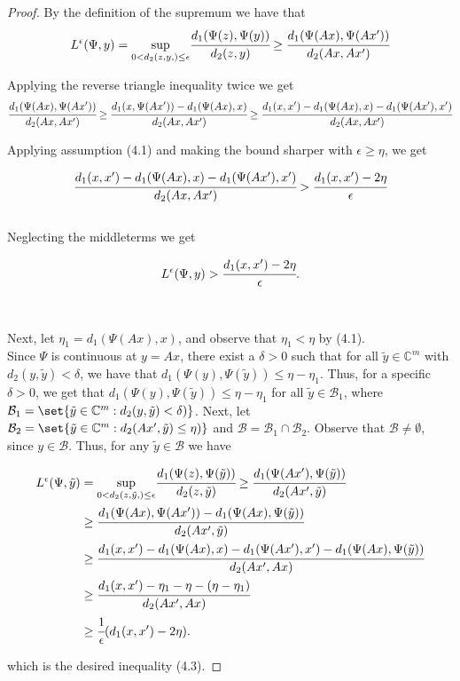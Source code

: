 \begin{proof}
By the definition of the supremum we have that
\begin{equation*}
L^{\epsilon}(\Psi ,y) = \underset{0<d_{2}(z,y,)\leq \epsilon}{\text{sup}} \cfrac{d_1(\Psi(z),\Psi(y))}{d_2(z,y)} \geq \cfrac{d_1(\Psi(Ax),\Psi(Ax'))}{d_2(Ax,Ax')} 
\end{equation*}

Applying the reverse triangle inequality twice we get
\begin{equation*}
\cfrac{d_1(\Psi(Ax),\Psi(Ax'))}{d_2(Ax,Ax')} \geq \cfrac{d_1(x,\Psi(Ax'))-d_1(\Psi(Ax),x)}{d_2(Ax,Ax')} \geq \cfrac{d_1(x,x')-d_1(\Psi(Ax),x)-d_1(\Psi(Ax'),x')}{d_2(Ax,Ax')}
\end{equation*}


Applying assumption (4.1) and making the bound sharper with $\epsilon \geq \eta$, we get

\begin{equation*}
\cfrac{d_1(x,x')-d_1(\Psi(Ax),x)-d_1(\Psi(Ax'),x')}{d_2(Ax,Ax')} >  \cfrac{d_1(x,x')-2\eta}{\epsilon} 
\end{equation*}
\\Neglecting the middleterms we get

\begin{equation*}
L^{\epsilon}(\Psi ,y) >  \cfrac{d_1(x,x')-2\eta}{\epsilon} . 
\end{equation*}
\\\\Next, let $\eta_1 = d_1(\Psi(Ax),x)$, and observe that $\eta_1 < \eta$ by (4.1).
\\Since $\Psi$ is continuous at $y = Ax$, there exist a $\delta > 0$ such that for all $\tilde{y} \in \mathbb{C}^m$ with $d_2(y,\tilde{y}) < \delta$, we have that $d_1(\Psi(y),\Psi(\tilde{y})) \leq \eta-\eta_1$. Thus, for a specific $\delta > 0$, we get that $d_1(\Psi(y),\Psi(\tilde{y})) \leq \eta-\eta_1$ for all $\tilde{y} \in \mathcal{B}_1$, where  $\mathcal{B}_1 = \set{\tilde{y} \in \mathbb{C}^m : d_2(y,\tilde{y}) < \delta)}$. Next, let $\mathcal{B}_2 = \set{\tilde{y} \in \mathbb{C}^m : d_2(Ax',\tilde{y}) \leq \eta)}$ and $\mathcal{B} = \mathcal{B}_1 \cap \mathcal{B}_2$. Observe that $\mathcal{B} \neq \emptyset$, since $y \in \mathcal{B}$. Thus, for any $\tilde{y} \in \mathcal{B}$ we have


\begin{equation*}
\begin{split}
L^{\epsilon}(\Psi ,\tilde{y}) & = \underset{0<d_{2}(z,\tilde{y},)\leq \epsilon}{\text{sup}} \cfrac{d_1(\Psi(z),\Psi(\tilde{y}))}{d_2(z,\tilde{y})} \geq \cfrac{d_1(\Psi(Ax'),\Psi(\tilde{y}))}{d_2(Ax',\tilde{y})} \\
& \geq \cfrac{d_1(\Psi(Ax),\Psi(Ax'))-d_1(\Psi(Ax),\Psi(\tilde{y}))}{d_2(Ax',\tilde{y})} \\
& \geq \cfrac{d_1(x,x')-d_1(\Psi(Ax),x)-d_1(\Psi(Ax'),x')-d_1(\Psi(Ax),\Psi(\tilde{y}))}{d_2(Ax',Ax)} \\
& \geq \cfrac{d_1(x,x')-\eta_1-\eta-(\eta-\eta_1)}{d_2(Ax',Ax)} \\
& \geq \cfrac{1}{\epsilon}  (d_1(x,x') - 2\eta). 
\end{split}
\end{equation*}

which is the desired inequality (4.3). 

\end{proof}



